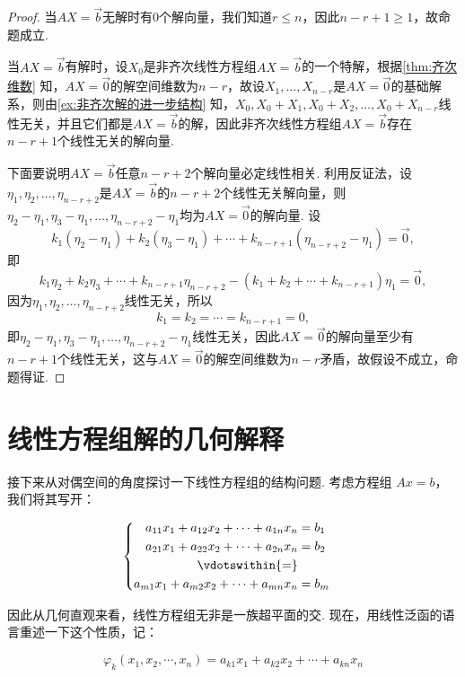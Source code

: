 \begin{proof}
    当$AX=\vec{b}$无解时有0个解向量，我们知道$r\leqslant n$，因此$n-r+1\geqslant 1$，故命题成立.

    当$AX=\vec{b}$有解时，设$X_0$是非齐次线性方程组$AX=\vec{b}$的一个特解，根据\autoref{thm:齐次维数} 知，$AX=\vec{0}$的解空间维数为$n-r$，故设$X_1,\ldots,X_{n-r}$是$AX=\vec{0}$的基础解系，则由\autoref{ex:非齐次解的进一步结构} 知，$X_0,X_0+X_1,X_0+X_2,\ldots,X_0+X_{n-r}$线性无关，并且它们都是$AX=\vec{b}$的解，因此非齐次线性方程组$AX=\vec{b}$存在$n-r+1$个线性无关的解向量.

    下面要说明$AX=\vec{b}$任意$n-r+2$个解向量必定线性相关. 利用反证法，设$\eta_1,\eta_2,\ldots,\eta_{n-r+2}$是$AX=\vec{b}$的$n-r+2$个线性无关解向量，则$\eta_2-\eta_1,\eta_3-\eta_1,\ldots,\eta_{n-r+2}-\eta_1$均为$AX=\vec{0}$的解向量. 设
    \[k_1(\eta_2-\eta_1)+k_2(\eta_3-\eta_1)+\cdots+k_{n-r+1}(\eta_{n-r+2}-\eta_1)=\vec{0},\]
    即
    \[k_1\eta_2+k_2\eta_3+\cdots+k_{n-r+1}\eta_{n-r+2}-(k_1+k_2+\cdots+k_{n-r+1})\eta_1=\vec{0},\]
    因为$\eta_1,\eta_2,\ldots,\eta_{n-r+2}$线性无关，所以
    \[k_1=k_2=\cdots=k_{n-r+1}=0,\]
    即$\eta_2-\eta_1,\eta_3-\eta_1,\ldots,\eta_{n-r+2}-\eta_1$线性无关，因此$AX=\vec{0}$的解向量至少有$n-r+1$个线性无关，这与$AX=\vec{0}$的解空间维数为$n-r$矛盾，故假设不成立，命题得证.
\end{proof}

\section{线性方程组解的几何解释}

接下来从对偶空间的角度探讨一下线性方程组的结构问题. 考虑方程组 $Ax = b$，我们将其写开：

\[
\begin{cases}
\begin{aligned}
    a_{11} x_1 + a_{12} x_2 + \cdots + a_{1n} x_n & = b_1 \\
    a_{21} x_1 + a_{22} x_2 + \cdots + a_{2n} x_n & = b_2 \\
    \vdotswithin{=} \\
    a_{m1} x_1 + a_{m2} x_2 + \cdots + a_{mn} x_n & = b_m
\end{aligned}
\end{cases}
\]

因此从几何直观来看，线性方程组无非是一族超平面的交. 现在，用线性泛函的语言重述一下这个性质，记：

\[
\varphi_k(x_1, x_2, \cdots, x_n) = a_{k1} x_1 + a_{k2} x_2 + \cdots + a_{kn} x_n
\]


